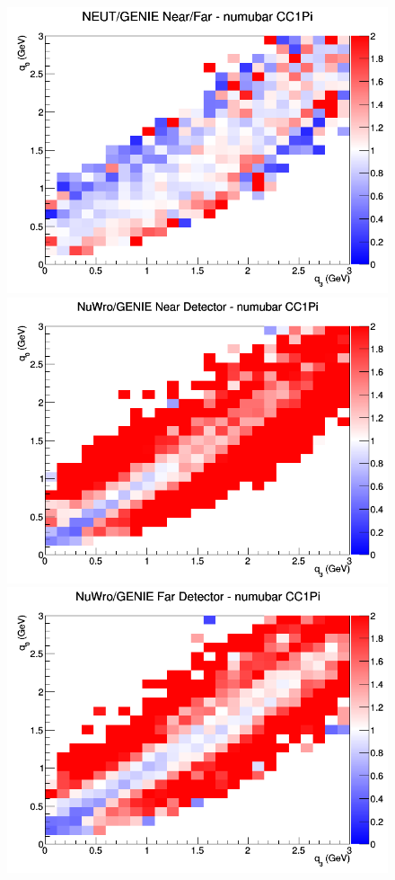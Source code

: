 \begin{figure}[h]
\endminipage
{}
\includegraphics[width=\linewidth]{eff_q0_q3/FGT/ratios/CC1Pi_NEUT_GENIE_numubar_NF_q3_q0.png}
\endminipage
\newline
{}
\includegraphics[width=\linewidth]{eff_q0_q3/FGT/ratios/CC1Pi_NuWro_GENIE_numubar_near_q3_q0.png}
\endminipage
{}
\includegraphics[width=\linewidth]{eff_q0_q3/FGT/ratios/CC1Pi_NuWro_GENIE_numubar_far_q3_q0.png}

\end{figure}
